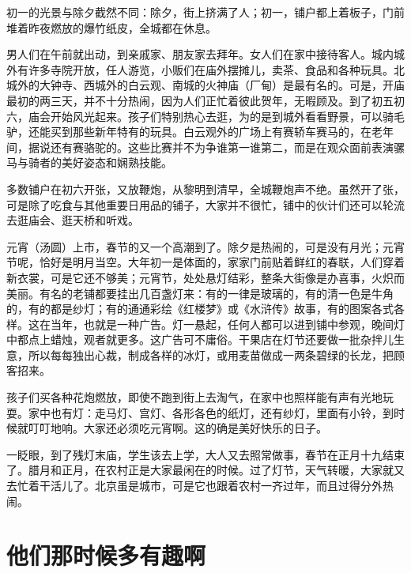 \documentclass[12pt,UTF-8,openany]{ctexbook}
\begin{document}
\begin{large}
    初一的光景与除夕截然不同：除夕，街上挤满了人；初一，铺户都上着板子，门前堆着昨夜燃放的爆竹纸皮，全城都在休息。
    
    男人们在午前就出动，到亲戚家、朋友家去拜年。女人们在家中接待客人。城内城外有许多寺院开放，任人游览，小贩们在庙外摆摊儿，卖茶、食品和各种玩具。北城外的大钟寺、西城外的白云观、南城的火神庙（厂甸）是最有名的。可是，开庙最初的两三天，并不十分热闹，因为人们正忙着彼此贺年，无暇顾及。到了初五初六，庙会开始风光起来。孩子们特别热心去逛，为的是到城外看看野景，可以骑毛驴，还能买到那些新年特有的玩具。白云观外的广场上有赛轿车赛马的，在老年间，据说还有赛骆驼的。这些比赛并不为争谁第一谁第二，而是在观众面前表演骡马与骑者的美好姿态和娴熟技能。
    
    多数铺户在初六开张，又放鞭炮，从黎明到清早，全城鞭炮声不绝。虽然开了张，可是除了吃食与其他重要日用品的铺子，大家并不很忙，铺中的伙计们还可以轮流去逛庙会、逛天桥和听戏。
    
    元宵（汤圆）上市，春节的又一个高潮到了。除夕是热闹的，可是没有月光；元宵节呢，恰好是明月当空。大年初一是体面的，家家门前贴着鲜红的春联，人们穿着新衣裳，可是它还不够美；元宵节，处处悬灯结彩，整条大街像是办喜事，火炽而美丽。有名的老铺都要挂出几百盏灯来：有的一律是玻璃的，有的清一色是牛角的，有的都是纱灯；有的通通彩绘《红楼梦》或《水浒传》故事，有的图案各式各样。这在当年，也就是一种广告。灯一悬起，任何人都可以进到铺中参观，晚间灯中都点上蜡烛，观者就更多。这广告可不庸俗。干果店在灯节还要做一批杂拌儿生意，所以每每独出心裁，制成各样的冰灯，或用麦苗做成一两条碧绿的长龙，把顾客招来。
    
    孩子们买各种花炮燃放，即使不跑到街上去淘气，在家中也照样能有声有光地玩耍。家中也有灯：走马灯、宫灯、各形各色的纸灯，还有纱灯，里面有小铃，到时候就叮叮地响。大家还必须吃元宵啊。这的确是美好快乐的日子。
    
    一眨眼，到了残灯末庙，学生该去上学，大人又去照常做事，春节在正月十九结束了。腊月和正月，在农村正是大家最闲在的时候。过了灯节，天气转暖，大家就又去忙着干活儿了。北京虽是城市，可是它也跟着农村一齐过年，而且过得分外热闹。
    
\end{large}



\chapter{他们那时候多有趣啊}
\end{document}
